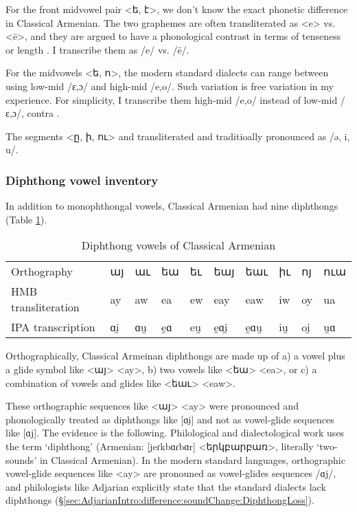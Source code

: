 For the front midvowel pair <ե, է>, we don't know the exact phonetic difference in Classical Armenian. The two graphemes are often transliterated as <e> vs. <ē>, and they are argued to have a phonological contrast in terms of tenseness \cite[14]{Thomson-1989-IntroClassicalArmenian} or length \citep[6]{Godel-1975-IntroClassicalArmenian}. I transcribe them as /e/ vs. /ē/. 


For the midvowels <ե, ո>, the modern standard dialects can range between using low-mid /ɛ,ɔ/ and high-mid /e,o/. Such variation is free variation in my experience. For simplicity, I transcribe them high-mid /e,o/ instead of low-mid /ɛ,ɔ/, contra \citet[1039]{Macak-2017-PhonoClassicalArmenian}. 

The segments <ը, ի, ու> and transliterated and traditioally pronounced as /ə, i, u/. 

\subsubsection{Diphthong vowel inventory}\label{sec:HossepIntro:phonotransc:Classical:Diphthong}
In addition to monophthongal vowels, Classical Armenian had nine diphthongs (Table \ref{tab:HossepIntr:classicalDiphthong}). 


\begin{table}[H]
	\centering
	\caption{Diphthong vowels of Classical Armenian}
	\label{tab:HossepIntr:classicalDiphthong}
	\begin{tabular}{|l|lllllllll|}
		\hline 
		Orthography & այ & աւ & եա & եւ & եայ& եաւ& իւ & ոյ & ուա\\
		HMB transliteration & ay & aw & ea & ew & eay& eaw& iw & oy & ua\\
		IPA transcription & ɑi̯ & ɑu̯ &e̯ɑ & eu̯ & e̯ɑi̯& e̯ɑu̯ & iu̯ & oi̯ & u̯ɑ
		\\ \hline
	\end{tabular}
\end{table}

Orthographically, Classical Armeinan diphthongs are made up of a) a vowel plus a glide symbol like <այ> <ay>, b) two vowels like <եա> <ea>, or c) a combination of vowels and glides like <եաւ> <eaw>. 

These orthographic sequences like <այ> <ay> were pronounced and phonologically treated as diphthongs like [ɑi̯] and not as vowel-glide sequences like [ɑj]. The evidence is the following. Philological and dialectological work uses the term `diphthong' (Armenian: [jeɾkbɑɾbɑr] <երկբարբառ>, literally `two-sounds' in Classical Armenian). In the modern standard languages, orthographic vowel-glide sequences like <ay> are pronouned as vowel-glides sequences /ɑj/, and philologists like Adjarian explicitly state that the standard dialects lack diphthongs (\S\ref{sec:AdjarianIntro:difference:soundChange:DiphthongLoss}). 

